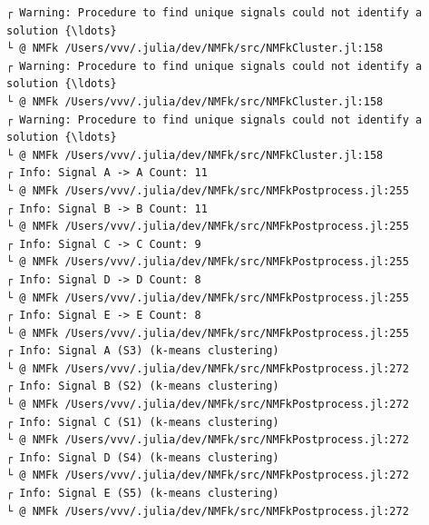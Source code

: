 \documentclass[11pt]{article}
\begin{document}
    \begin{Verbatim}[commandchars=\\\{\}]
┌ Warning: Procedure to find unique signals could not identify a solution {\ldots}
└ @ NMFk /Users/vvv/.julia/dev/NMFk/src/NMFkCluster.jl:158
┌ Warning: Procedure to find unique signals could not identify a solution {\ldots}
└ @ NMFk /Users/vvv/.julia/dev/NMFk/src/NMFkCluster.jl:158
┌ Warning: Procedure to find unique signals could not identify a solution {\ldots}
└ @ NMFk /Users/vvv/.julia/dev/NMFk/src/NMFkCluster.jl:158
┌ Info: Signal A -> A Count: 11
└ @ NMFk /Users/vvv/.julia/dev/NMFk/src/NMFkPostprocess.jl:255
┌ Info: Signal B -> B Count: 11
└ @ NMFk /Users/vvv/.julia/dev/NMFk/src/NMFkPostprocess.jl:255
┌ Info: Signal C -> C Count: 9
└ @ NMFk /Users/vvv/.julia/dev/NMFk/src/NMFkPostprocess.jl:255
┌ Info: Signal D -> D Count: 8
└ @ NMFk /Users/vvv/.julia/dev/NMFk/src/NMFkPostprocess.jl:255
┌ Info: Signal E -> E Count: 8
└ @ NMFk /Users/vvv/.julia/dev/NMFk/src/NMFkPostprocess.jl:255
┌ Info: Signal A (S3) (k-means clustering)
└ @ NMFk /Users/vvv/.julia/dev/NMFk/src/NMFkPostprocess.jl:272
┌ Info: Signal B (S2) (k-means clustering)
└ @ NMFk /Users/vvv/.julia/dev/NMFk/src/NMFkPostprocess.jl:272
┌ Info: Signal C (S1) (k-means clustering)
└ @ NMFk /Users/vvv/.julia/dev/NMFk/src/NMFkPostprocess.jl:272
┌ Info: Signal D (S4) (k-means clustering)
└ @ NMFk /Users/vvv/.julia/dev/NMFk/src/NMFkPostprocess.jl:272
┌ Info: Signal E (S5) (k-means clustering)
└ @ NMFk /Users/vvv/.julia/dev/NMFk/src/NMFkPostprocess.jl:272
    \end{Verbatim}

    \begin{center}
    \end{center}
    { \hspace*{\fill} \\}

    \begin{Verbatim}[commandchars=\\\{\}]

    \end{Verbatim}

    \begin{center}
    \end{center}
    { \hspace*{\fill} \\}
\end{document}
